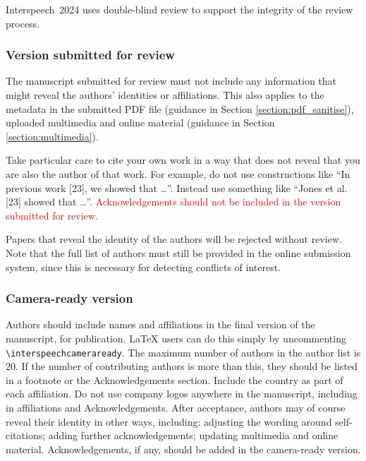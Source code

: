\documentclass{Interspeech2024}
\newcommand{\red}[1]{\textcolor{red}{#1}}
\begin{document}
Interspeech~2024 uses double-blind review to support the integrity of the review process. 

\subsubsection{Version submitted for review}

The manuscript submitted for review must not include any information that might reveal the authors' identities or affiliations. This also applies to the metadata in the submitted PDF file (guidance in Section \ref{section:pdf_sanitise}), uploaded multimedia and online material (guidance in Section \ref{section:multimedia}).
 
Take particular care to cite your own work in a way that does not reveal that you are also the author of that work. For example, do not use constructions like ``In previous work [23], we showed that \ldots''. Instead use something like ``Jones et al. [23] showed that \ldots''.
\red{Acknowledgements should not be included in the version submitted for review.}

Papers that reveal the identity of the authors will be rejected without review.
Note that the full list of authors must still be provided in the online submission system, since this is necessary for detecting conflicts of interest. 

\subsubsection{Camera-ready version}

Authors should include names and affiliations in the final version of the manuscript, for publication. \LaTeX\xspace users can do this simply by uncommenting  \texttt{\textbackslash interspeechcameraready}. The maximum number of authors in the author list is 20. If the number of contributing authors is more than this, they should be listed in a footnote or the Acknowledgements section. Include the country as part of each affiliation. Do not use company logos anywhere in the manuscript, including in affiliations and Acknowledgements. After acceptance, authors may of course reveal their identity in other ways, including: adjusting the wording around self-citations; adding further acknowledgements; updating multimedia and online material. Acknowledgements, if any, should be added in the camera-ready version.
\end{document}
